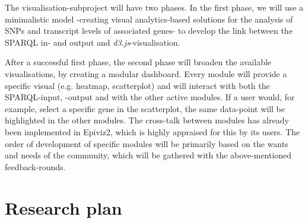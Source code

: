 \documentclass[twoside,fontsize=10pt]{article}
\begin{document}
\noindent
The visualisation-subproject will have two phases. In the first phase, we will use a minimalistic model -creating visual analytics-based solutions for the analysis of SNPs and transcript levels of associated genes- to develop the link between the SPARQL in- and output and \textit{d3.js}-visualisation. 

After a successful first phase, the second phase will broaden the available visualisations, by creating a modular dashboard. Every module will provide a specific visual (e.g. heatmap, scatterplot) and will interact with both the SPARQL-input, -output and with the other active modules. If a user would, for example, select a specific gene in the scatterplot, the same data-point will be highlighted in the other modules. The cross-talk between modules has already been implemented in Epiviz2\cite{Chelaru2014}, which is highly appraised for this by its users. The order of development of specific modules will be primarily based on the wants and needs of the community, which will be gathered with the above-mentioned feedback-rounds.
\section*{Research plan}
\end{document}
